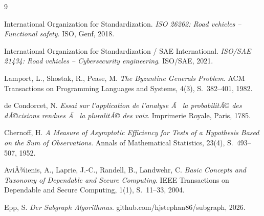 ﻿\documentclass[a4paper,12pt]{article}
\theoremstyle{definition}
\begin{document}
\begin{thebibliography}{9}

International Organization for Standardization.
\emph{ISO 26262: Road vehicles -- Functional safety}.
ISO, Genf, 2018.

International Organization for Standardization / SAE International.
\emph{ISO/SAE 21434: Road vehicles -- Cybersecurity engineering}.
ISO/SAE, 2021.

Lamport, L., Shostak, R., Pease, M.
\emph{The Byzantine Generals Problem}.
ACM Transactions on Programming Languages and Systems, 4(3), S.~382--401, 1982.

de Condorcet, N.
\emph{Essai sur l'application de l'analyse Ã  la probabilitÃ© des dÃ©cisions rendues Ã  la pluralitÃ© des voix}.
Imprimerie Royale, Paris, 1785.

Chernoff, H.
\emph{A Measure of Asymptotic Efficiency for Tests of a Hypothesis Based on the Sum of Observations}.
Annals of Mathematical Statistics, 23(4), S.~493--507, 1952.

AviÅ¾ienis, A., Laprie, J.-C., Randell, B., Landwehr, C.
\emph{Basic Concepts and Taxonomy of Dependable and Secure Computing}.
IEEE Transactions on Dependable and Secure Computing, 1(1), S.~11--33, 2004.

Epp, S.
\emph{Der Subgraph Algorithmus}.
github.com/hjstephan86/subgraph, 2026.

\end{thebibliography}
\end{document}
